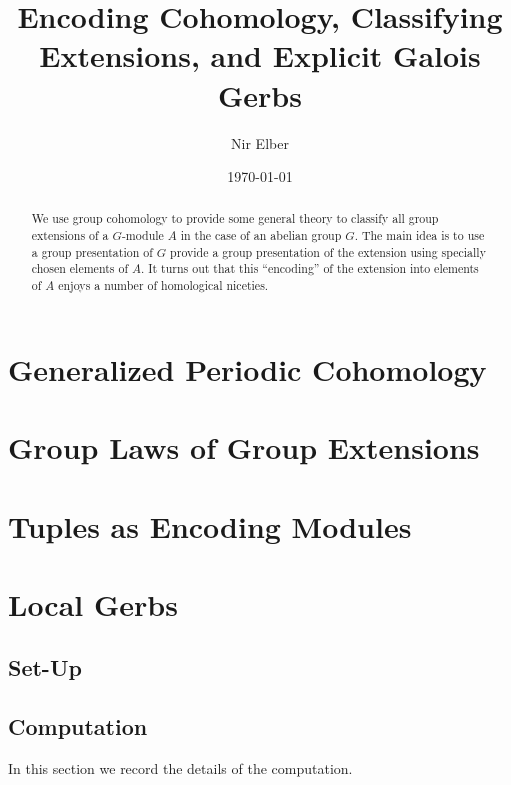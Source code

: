 \documentclass{article}
\title{Encoding Cohomology, Classifying Extensions, and Explicit Galois Gerbs}
\author{Nir Elber}
\date{\today}
\numberwithin{equation}{section}
\begin{document}
\maketitle

\begin{abstract}
	\noindent We use group cohomology to provide some general theory to classify all group extensions of a $ G$-module $A$ in the case of an abelian group $ G$. The main idea is to use a group presentation of $G$ provide a group presentation of the extension using specially chosen elements of $A$. It turns out that this ``encoding'' of the extension into elements of $A$ enjoys a number of homological niceties.
\end{abstract}

\setcounter{tocdepth}{4}
\tableofcontents

\section{Generalized Periodic Cohomology} \label{sec:crackpot}


\section{Group Laws of Group Extensions} \label{sec:general}




\section{Tuples as Encoding Modules} \label{sec:tuplestudy}


\section{Local Gerbs}
\subsection{Set-Up} \label{sec:setup}


\subsection{Computation}
In this section we record the details of the computation.
\end{document}
